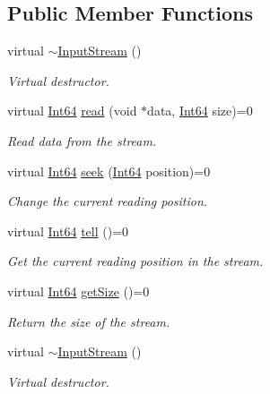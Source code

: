 \subsection*{Public Member Functions}
\begin{DoxyCompactItemize}
\item 
virtual \hyperlink{classsf_1_1_input_stream_a4b2eb0f92323e630bd0542bc6191682e}{$\sim$\-Input\-Stream} ()
\begin{DoxyCompactList}\small\item\em Virtual destructor. \end{DoxyCompactList}\item 
virtual \hyperlink{namespacesf_a2840579fed3494d9f330baf7a5a19903}{Int64} \hyperlink{classsf_1_1_input_stream_a8dd89c74c1acb693203f50e750c6ae53}{read} (void $\ast$data, \hyperlink{namespacesf_a2840579fed3494d9f330baf7a5a19903}{Int64} size)=0
\begin{DoxyCompactList}\small\item\em Read data from the stream. \end{DoxyCompactList}\item 
virtual \hyperlink{namespacesf_a2840579fed3494d9f330baf7a5a19903}{Int64} \hyperlink{classsf_1_1_input_stream_a76aba8e5d5cf9b1c5902d5e04f7864fc}{seek} (\hyperlink{namespacesf_a2840579fed3494d9f330baf7a5a19903}{Int64} position)=0
\begin{DoxyCompactList}\small\item\em Change the current reading position. \end{DoxyCompactList}\item 
virtual \hyperlink{namespacesf_a2840579fed3494d9f330baf7a5a19903}{Int64} \hyperlink{classsf_1_1_input_stream_a599515b9ccdbddb6fef5a98424fd559c}{tell} ()=0
\begin{DoxyCompactList}\small\item\em Get the current reading position in the stream. \end{DoxyCompactList}\item 
virtual \hyperlink{namespacesf_a2840579fed3494d9f330baf7a5a19903}{Int64} \hyperlink{classsf_1_1_input_stream_a311eaaaa65d636728e5153b574b72d5d}{get\-Size} ()=0
\begin{DoxyCompactList}\small\item\em Return the size of the stream. \end{DoxyCompactList}\item 
virtual \hyperlink{classsf_1_1_input_stream_a4b2eb0f92323e630bd0542bc6191682e}{$\sim$\-Input\-Stream} ()
\begin{DoxyCompactList}\small\item\em Virtual destructor. \end{DoxyCompactList}\item 

\end{DoxyCompactItemize}
